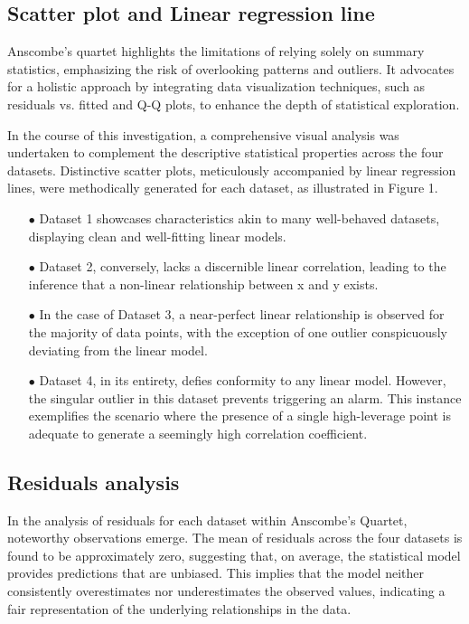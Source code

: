 \documentclass[12pt,doublespace]{article}
\begin{document}
	\subsection{Scatter plot and Linear regression line}
	Anscombe's quartet highlights the limitations of relying solely on summary statistics, emphasizing the risk of overlooking patterns and outliers. It advocates for a holistic approach by integrating data visualization techniques, such as residuals vs. fitted and Q-Q plots, to enhance the depth of statistical exploration. 
		
	In the course of this investigation, a comprehensive visual analysis was undertaken to complement the descriptive statistical properties across the four datasets. Distinctive scatter plots, meticulously accompanied by linear regression lines, were methodically generated for each dataset, as illustrated in Figure 1.
	\begin{itemize}
	 \item[$\bullet$]
	 Dataset 1 showcases characteristics akin to many well-behaved datasets, displaying clean and well-fitting linear models.
	\end{itemize}
	\begin{itemize}
	 \item[$\bullet$]
	Dataset 2, conversely, lacks a discernible linear correlation, leading to the inference that a non-linear relationship between x and y exists.  
	\end{itemize}
	\begin{itemize}
   	 \item[$\bullet$]
	In the case of Dataset 3, a near-perfect linear relationship is observed for the majority of data points, with the exception of one outlier conspicuously deviating from the linear model. 
	\end{itemize}
	\begin{itemize}
	 \item[$\bullet$]
	Dataset 4, in its entirety, defies conformity to any linear model. However, the singular outlier in this dataset prevents triggering an alarm. This instance exemplifies the scenario where the presence of a single high-leverage point is adequate to generate a seemingly high correlation coefficient.
	\end{itemize}
	\subsection{Residuals analysis}
	In the analysis of residuals for each dataset within Anscombe's Quartet, noteworthy observations emerge. The mean of residuals across the four datasets is found to be approximately zero, suggesting that, on average, the statistical model provides predictions that are unbiased. This implies that the model neither consistently overestimates nor underestimates the observed values, indicating a fair representation of the underlying relationships in the data.
\end{document}
